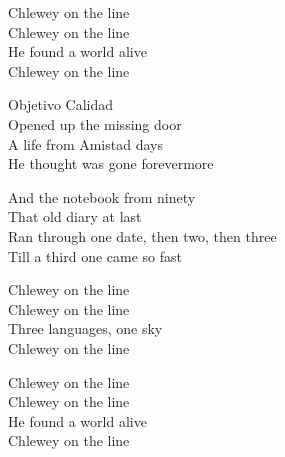 \begin{lyrics}
Chlewey on the line\\
Chlewey on the line\\
He found a world alive\\
Chlewey on the line

Objetivo Calidad\\
Opened up the missing door\\
A life from Amistad days\\
He thought was gone forevermore

And the notebook from ninety\\
That old diary at last\\
Ran through one date, then two, then three\\
Till a third one came so fast

Chlewey on the line\\
Chlewey on the line\\
Three languages, one sky\\
Chlewey on the line

Chlewey on the line\\
Chlewey on the line\\
He found a world alive\\
Chlewey on the line
\end{lyrics}

